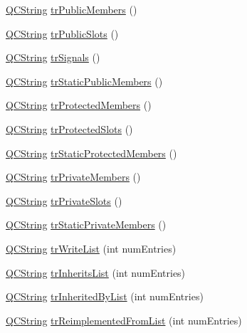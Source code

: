 \begin{DoxyCompactItemize}
\item 
\hyperlink{class_q_c_string}{Q\+C\+String} \hyperlink{class_translator_polish_ab35e2af702b80c97e7642f02a2e89671}{tr\+Public\+Members} ()
\item 
\hyperlink{class_q_c_string}{Q\+C\+String} \hyperlink{class_translator_polish_a945e916d206e501950a2acbe640ba1e0}{tr\+Public\+Slots} ()
\item 
\hyperlink{class_q_c_string}{Q\+C\+String} \hyperlink{class_translator_polish_ad79acd5ee61ccb49050dc22354cc4318}{tr\+Signals} ()
\item 
\hyperlink{class_q_c_string}{Q\+C\+String} \hyperlink{class_translator_polish_af5136569f8661f44d9ca8beffcaead62}{tr\+Static\+Public\+Members} ()
\item 
\hyperlink{class_q_c_string}{Q\+C\+String} \hyperlink{class_translator_polish_a47e84feab31cd247e73920da5100be99}{tr\+Protected\+Members} ()
\item 
\hyperlink{class_q_c_string}{Q\+C\+String} \hyperlink{class_translator_polish_ae392ac7cba7e92e3b5035b2579e43563}{tr\+Protected\+Slots} ()
\item 
\hyperlink{class_q_c_string}{Q\+C\+String} \hyperlink{class_translator_polish_a2ee548d74d01e7b179d8d4d17a65fbd2}{tr\+Static\+Protected\+Members} ()
\item 
\hyperlink{class_q_c_string}{Q\+C\+String} \hyperlink{class_translator_polish_aaca021924f68f1994608c5f8e5efcd52}{tr\+Private\+Members} ()
\item 
\hyperlink{class_q_c_string}{Q\+C\+String} \hyperlink{class_translator_polish_af0c96471d2796902f26a48c5e61888f0}{tr\+Private\+Slots} ()
\item 
\hyperlink{class_q_c_string}{Q\+C\+String} \hyperlink{class_translator_polish_ace04bf94fbd55f6a88b14be88ddbcbd7}{tr\+Static\+Private\+Members} ()
\item 
\hyperlink{class_q_c_string}{Q\+C\+String} \hyperlink{class_translator_polish_ac620731bc7c549f184826d9e558db0aa}{tr\+Write\+List} (int num\+Entries)
\item 
\hyperlink{class_q_c_string}{Q\+C\+String} \hyperlink{class_translator_polish_a46060df2c96f771844d1228b29d893ce}{tr\+Inherits\+List} (int num\+Entries)
\item 
\hyperlink{class_q_c_string}{Q\+C\+String} \hyperlink{class_translator_polish_a2ee269237103a5832d56224baec80bef}{tr\+Inherited\+By\+List} (int num\+Entries)
\item 
\hyperlink{class_q_c_string}{Q\+C\+String} \hyperlink{class_translator_polish_ad0b200adbf810f8fb14c57d7a7a504e9}{tr\+Reimplemented\+From\+List} (int num\+Entries)

\end{DoxyCompactItemize}
